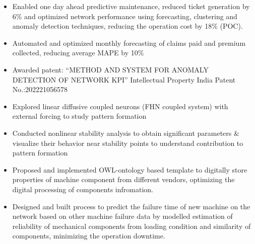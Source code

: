 \documentclass[10pt,a4paper,ragged2e,withhyper]{altacv}
\begin{document}
\begin{itemize}
\item Enabled one day ahead predictive maintenance, reduced ticket generation by 6\% and optimized network performance using forecasting, clustering  and anomaly detection techniques, reducing the operation cost by 18\% (POC).
\end{itemize}

\begin{itemize}
\item Automated and optimized monthly forecasting of claims paid and premium collected, reducing average MAPE by 10\%
\end{itemize}

\par
{}
\label{sec:org0c57052}
\begin{itemize}
\item Awarded patent: ``METHOD AND SYSTEM FOR ANOMALY DETECTION OF NETWORK KPI'' Intellectual Property India Patent No.:202221056578
\end{itemize}
{}
\label{sec:org23d19c0}


\begin{itemize}
\item Explored linear diffusive coupled neurons (FHN coupled system) with external forcing to study pattern formation
\item Conducted nonlinear stability analysis to obtain significant parameters \& visualize their behavior near stability points to understand contribution to pattern formation
\end{itemize}

\par\divider\par


\begin{itemize}
\item Proposed and implemented OWL-ontology based template to digitally store properties of machine component from different vendors, optimizing the digital processing of components infromation.
\item Designed and built process to predict the failure time of new machine on the network based on other machine failure data by modelled estimation of reliability of mechanical components from loading condition and similarity of components, minimizing the operation downtime.
\end{itemize}
\end{document}
